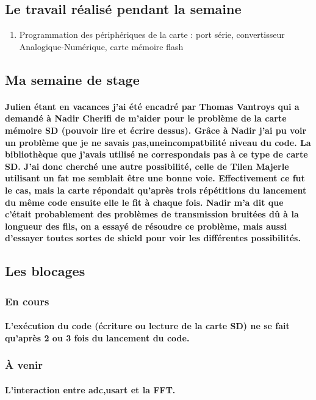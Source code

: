 \documentclass[a4paper]{article}
\begin{document}
 \subsection{Le travail réalisé pendant la semaine}
 \begin{enumerate}
\item {Programmation des périphériques de la carte : port série,
convertisseur Analogique-Numérique, carte mémoire flash}
\end{enumerate}

\subsection{Ma semaine de stage}
    \paragraph{Julien étant en vacances j'ai été encadré par Thomas Vantroys qui a demandé à Nadir Cherifi de m'aider pour le problème de la carte mémoire SD (pouvoir lire et écrire dessus). Grâce à Nadir j'ai pu voir un problème que je ne savais pas,uneincompatbilité niveau du code. La bibliothèque que j'avais utilisé ne correspondais pas à ce type de carte SD. J'ai donc cherché une autre possibilité, celle de Tilen Majerle utilisant un fat me semblait être une bonne voie. Effectivement ce fut le cas, mais la carte répondait qu'après trois répétitions du lancement du même code ensuite elle le fit à chaque fois. Nadir m'a dit que c'était probablement des problèmes de transmission bruitées dû à la longueur des fils, on a essayé de résoudre ce problème, mais aussi d'essayer toutes sortes de shield pour voir les différentes possibilités.}
    
    \subsection{Les blocages}
\subsubsection{En cours}
    \paragraph{L'exécution du code (écriture ou lecture de la carte SD) ne se fait qu’après 2 ou 3 fois du lancement du code.}
\subsubsection{À venir}
    \paragraph{L'interaction entre adc,usart et la FFT.}
	\paragraph{}
\end{document}
